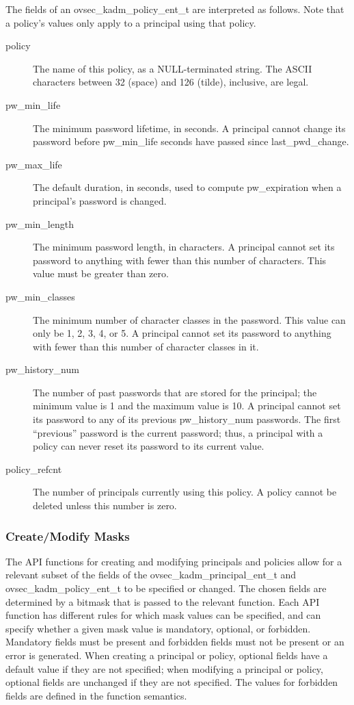 The fields of an ovsec_kadm_policy_ent_t are interpreted as follows.
Note that a policy's values only apply to a principal using that
policy.

\begin{description}
\item[policy] The name of this policy, as a NULL-terminated string.
The ASCII characters between 32 (space) and 126 (tilde), inclusive,
are legal.

\item[pw_min_life] The minimum password lifetime, in seconds.
A principal cannot change its password before pw_min_life seconds have
passed since last_pwd_change.

\item[pw_max_life] The default duration, in seconds, used to compute
pw_expiration when a principal's password is changed.

\item[pw_min_length] The minimum password length, in characters.  A
principal cannot set its password to anything with fewer than this
number of characters.  This value must be greater than zero.

\item[pw_min_classes] The minimum number of character classes in the
password.  This value can only be 1, 2, 3, 4, or 5.  A principal cannot
set its password to anything with fewer than this number of character
classes in it.

\item[pw_history_num] The number of past passwords that are
stored for the principal; the minimum value is 1 and the maximum value
is 10.  A principal cannot set its password to any of its previous
pw_history_num passwords.  The first ``previous'' password is the
current password; thus, a principal with a policy can never reset its
password to its current value.

\item[policy_refcnt]  The number of principals currently using this policy.
A policy cannot be deleted unless this number is zero.
\end{description}

\subsubsection{Create/Modify Masks}
\label{sec:masks}

The API functions for creating and modifying principals and policies
allow for a relevant subset of the fields of the
ovsec_kadm_principal_ent_t and ovsec_kadm_policy_ent_t to be specified
or changed.  The chosen fields are determined by a bitmask that is
passed to the relevant function.  Each API function has different
rules for which mask values can be specified, and can specify whether
a given mask value is mandatory, optional, or forbidden.  Mandatory
fields must be present and forbidden fields must not be present or an
error is generated.  When creating a principal or policy, optional
fields have a default value if they are not specified; when modifying
a principal or policy, optional fields are unchanged if they are not
specified.  The values for forbidden fields are defined in the
function semantics.

